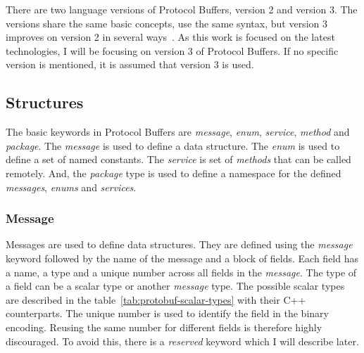 There are two language versions of Protocol Buffers, version 2 and version 3.
The versions share the same basic concepts, use the same syntax, but version 3 improves on version 2 in several ways~\cite{protobuf-proto3}.
As this work is focused on the latest technologies, I will be focusing on version 3 of Protocol Buffers.
If no specific version is mentioned, it is assumed that version 3 is used.

\subsection{Structures}
The basic keywords in Protocol Buffers are \textit{message}, \textit{enum}, \textit{service}, \textit{method} and \textit{package}.
The \textit{message} is used to define a data structure.
The \textit{enum} is used to define a set of named constants.
The \textit{service} is set of \textit{methods} that can be called remotely.
And, the \textit{package} type is used to define a namespace for the defined \textit{messages}, \textit{enums} and \textit{services}.
\cite{protobuf-proto3}

\subsubsection{Message}
Messages are used to define data structures.
They are defined using the \textit{message} keyword followed by the name of the message and a block of fields.
Each field has a name, a type and a unique number across all fields in the \textit{message}.
The type of a field can be a scalar type or another \textit{message} type.
The possible scalar types are described in the table~\ref{tab:protobuf-scalar-types} with their C++ counterparts.
The unique number is used to identify the field in the binary encoding.
Reusing the same number for different fields is therefore highly discouraged.
To avoid this, there is a \textit{reserved} keyword which I will describe later.
\cite{protobuf-proto3}

